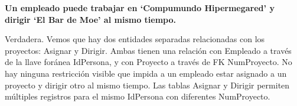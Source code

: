\textbf{Un empleado puede trabajar en ‘Compumundo Hipermegared’ y dirigir ‘El Bar de Moe’ al mismo tiempo.}\vspace{.3cm}

Verdadera. Vemos que hay dos entidades separadas relacionadas con los proyectos: Asignar y Dirigir. Ambas tienen una relación con Empleado a través de la llave foránea IdPersona, y con Proyecto a través de FK NumProyecto. No hay ninguna restricción visible que impida a un empleado estar asignado a un proyecto y dirigir otro al mismo tiempo. Las tablas Asignar y Dirigir permiten múltiples registros para el mismo IdPersona con diferentes NumProyecto.
